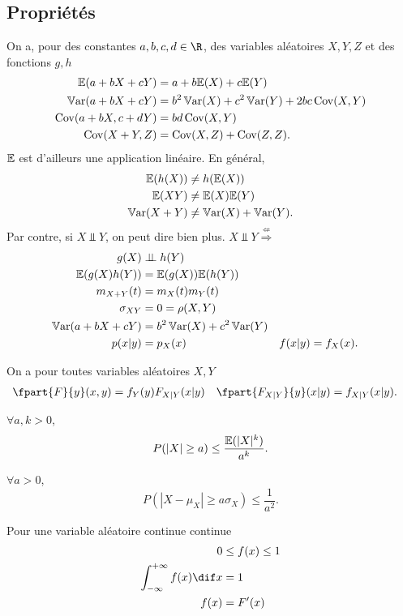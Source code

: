 \subsection{Propriétés}
On a, pour des constantes $a, b, c, d \in \R$, des variables aléatoires $X, Y, Z$ et des fonctions $g, h$
\begin{align*}
  \mathbb{E}(a + bX + cY) & = a + b\mathbb{E}(X) + c\mathbb{E}(Y)\\
  \operatorname{\mathbb{V}ar}(a + bX + cY) & = b^2\operatorname{\mathbb{V}ar}(X) + c^2\operatorname{\mathbb{V}ar}(Y) + 2bc\operatorname{Cov}(X,Y)\\
  \operatorname{Cov}(a + bX, c + dY) & = bd \operatorname{Cov}(X, Y)\\
  \operatorname{Cov}(X + Y, Z) & = \operatorname{Cov}(X, Z) + \operatorname{Cov}(Z, Z).
\end{align*}
$\mathbb{E}$ est d'ailleurs une application linéaire.
En général,
\begin{align*}
  \mathbb{E}(h(X)) & \neq h(\mathbb{E}(X))\\
  \mathbb{E}(XY) & \neq \mathbb{E}(X) \mathbb{E}(Y)\\
  \operatorname{\mathbb{V}ar}(X + Y) & \neq \operatorname{\mathbb{V}ar}(X) + \operatorname{\mathbb{V}ar}(Y).
\end{align*}
Par contre, si $X \Perp Y$, on peut dire bien plus.
$X \Perp Y \stackrel{\nLeftarrow}{\Rightarrow}$
\begin{align}
  g(X) & \perp\!\!\!\perp h(Y)\\
  \mathbb{E}(g(X)h(Y)) & = \mathbb{E}(g(X)) \mathbb{E}(h(Y))\\
  \label{eq:sum_mgf}
  m_{X + Y}(t) & = m_X(t) m_Y(t)\\
  \sigma_{XY} & = 0 = \rho(X, Y)\\
  \operatorname{\mathbb{V}ar}(a + bX + cY) & = b^2\operatorname{\mathbb{V}ar}(X) + c^2\operatorname{\mathbb{V}ar}(Y)\\
  p(x | y) & = p_X(x) & f(x | y) & = f_X(x).
\end{align}

On a pour toutes variables aléatoires $X, Y$
\begin{align*}
  \fpart{F}{y}(x,y) & = f_Y(y) F_{X|Y}(x|y) & \fpart{F_{X|Y}}{y}(x|y) & = f_{X|Y}(x|y).
\end{align*}

\begin{myineg}[Markov]
  $\forall a, k > 0$,
  \[ P(|X| \geq a) \leq \frac{\mathbb{E}(|X|^k)}{a^k}. \]
\end{myineg}

\begin{myineg}[Chebyshev]
  $\forall a > 0$,
  \[ P(|X - \mu_X| \geq a\sigma_X) \leq \frac{1}{a^2}. \]
\end{myineg}

Pour une variable aléatoire continue continue
\begin{align*}
  0 & \leq f(x) \leq 1\\
  \int_{-\infty}^{+\infty} f(x) \dif x & = 1\\
  f(x) & = F'(x)
\end{align*}


